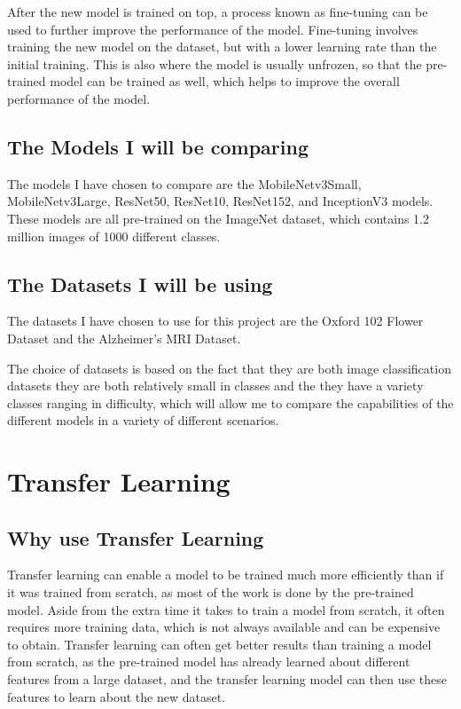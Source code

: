 \documentclass[]{final_report}
\begin{document}
After the new model is trained on top, a process known as fine-tuning can be used to further improve the performance of the model.
Fine-tuning involves training the new model on the dataset, but with a lower learning rate than the initial training.
This is also where the model is usually unfrozen, so that the pre-trained model can be trained as well, which helps to improve the overall performance of the model.

\section{The Models I will be comparing}
The models I have chosen to compare are the MobileNetv3Small\cite{DBLP:journals/corr/abs-1905-02244}, MobileNetv3Large\cite{DBLP:journals/corr/abs-1905-02244}, ResNet50\cite{DBLP:journals/corr/HeZRS15}, ResNet10\cite{DBLP:journals/corr/HeZRS15}, ResNet152\cite{DBLP:journals/corr/HeZRS15}, and InceptionV3\cite{DBLP:journals/corr/SzegedyVISW15} models.
These models are all pre-trained on the ImageNet dataset, which contains 1.2 million images of 1000 different classes.

\section{The Datasets I will be using}
The datasets I have chosen to use for this project are the Oxford 102 Flower Dataset\cite{OxfordFlowers102} and the Alzheimer's MRI Dataset\cite{AlzheimersDataset}.

The choice of datasets is based on the fact that they are both image classification datasets they are both relatively small in classes and
the they have a variety classes ranging in difficulty, which will allow me to compare the capabilities of the different models in a variety of different scenarios.

\chapter{Transfer Learning}

\section{Why use Transfer Learning}
Transfer learning can enable a model to be trained much more efficiently than if it was trained from scratch, as most of the work is done by the pre-trained model.
Aside from the extra time it takes to train a model from scratch, it often requires more training data, which is not always available and can be expensive to obtain.
Transfer learning can often get better results than training a model from scratch, as the pre-trained model has already learned about different features from a large dataset,
and the transfer learning model can then use these features to learn about the new dataset.
\end{document}
